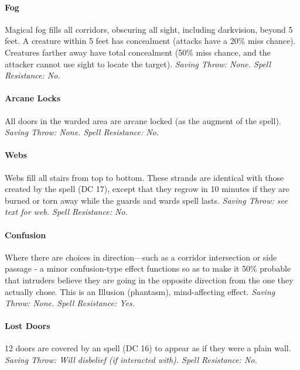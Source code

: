 \paragraph{Fog}
Magical fog fills all corridors, obscuring all sight, including darkvision, beyond 5 feet. 
A creature within 5 feet has concealment (attacks have a 20\% miss chance).
Creatures farther away have total concealment (50\% miss chance, and the attacker cannot use sight to locate the target). 
\emph{Saving Throw: None. Spell Resistance: No.}
\paragraph{Arcane Locks}
All doors in the warded area are arcane locked (as the augment of the  spell). \emph{Saving Throw: None. Spell Resistance: No.}
\paragraph{Webs}
Webs fill all stairs from top to bottom. These strands are identical with those created by the  spell (DC 17), 
except that they regrow in 10 minutes if they are burned or torn away while the guards and wards spell lasts. 
\emph{Saving Throw: see text for web. Spell Resistance: No.}
\paragraph{Confusion}
Where there are choices in direction—such as a corridor intersection or side passage - 
a minor confusion-type effect functions so as to make it 50\% probable that intruders believe they are going in the opposite direction from the one they actually chose. 
This is an Illusion (phantasm), mind-affecting effect. \emph{Saving Throw: None. Spell Resistance: Yes.}
\paragraph{Lost Doors}
12 doors are covered by an  spell (DC 16) to appear as if they were a plain wall. \emph{Saving Throw: Will disbelief (if interacted with). Spell Resistance: No.}

